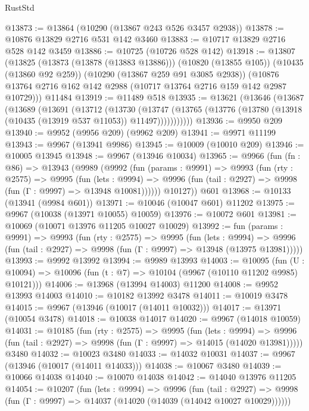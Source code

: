 \begin{lexlean}{RustStd}
\begin{coremodule}
{\begin{coremodule}
{{{{{{{{{{{{{{{{{{{{{{{{{{{{{{{{{{{{{{{{{{{{{{{{{{{{{{{{{{{{{{{{{{{{{{{{{{{{{{@13873 := @13864 (@10290 (@13867 @243 @526 @3457 @2938))
@13878 := @10876 @13829 @2716 @531 @142 @3460
@13883 := @10717 @13829 @2716 @528 @142 @3459
@13886 := @10725 (@10726 @528 @142)
@13918 := @13807
    (@13825
      (@13873 (@13878 (@13883 @13886)))
      (@10820 (@13855 @105))
      (@10435 (@13860 @92 @259))
      (@10290 (@13867 @259 @91 @3085 @2938))
      (@10876 @13764 @2716 @162 @142 @2988 (@10717 @13764 @2716 @159 @142 @2987 @10729)))
    @11484
@13919 := @11489 @518
@13935 := @13621
    (@13646
      (@13687
        (@13689
          (@13691
            (@13712
              (@13730
                (@13747
                  (@13765 (@13776 (@13780 (@13918 (@10435 (@13919 @537 @11053)) @11497)))))))))))
@13936 := @9950 @209
@13940 := @9952 (@9956 @209) (@9962 @209)
@13941 := @9971 @11199
@13943 := @9967 (@13941 @9986)
@13945 := @10009 (@10010 @209)
@13946 := @10005 @13945
@13948 := @9967 (@13946 @10034)
@13965 := @9966
    (fun (fn : @86) =>
    @13943
      (@9989
        (@9992
          (fun (params : @9991) =>
          @9993
            (fun (rty : @2575) =>
            @9995
              (fun (lets : @9994) =>
              @9996 (fun (tail : @2927) => @9998 (fun (Γ : @9997) => @13948 @10081))))))
        @10127))
    @601
@13968 := @10133 (@13941 (@9984 @601))
@13971 := @10046 (@10047 @601) @11202
@13975 := @9967 (@10038 (@13971 @10055) @10059)
@13976 := @10072 @601
@13981 := @10069 (@10071 @13976 @11205 @10027 @10029)
@13992 := fun (params : @9991) =>
  @9993
    (fun (rty : @2575) =>
    @9995
      (fun (lets : @9994) =>
      @9996 (fun (tail : @2927) => @9998 (fun (Γ : @9997) => @13948 (@13975 @13981)))))
@13993 := @9992 @13992
@13994 := @9989 @13993
@14003 := @10095
    (fun (U : @10094) => @10096 (fun (t : @7) => @10104 (@9967 (@10110 @11202 @9985) @10121)))
@14006 := @13968 (@13994 @14003) @11200
@14008 := @9952 @13993 @14003
@14010 := @10182 @13992 @3478
@14011 := @10019 @3478
@14015 := @9967 (@13946 (@10017 (@14011 @10032)))
@14017 := @13971 (@10054 @3478)
@14018 := @10038 @14017
@14020 := @9967 (@14018 @10059)
@14031 := @10185
    (fun (rty : @2575) =>
    @9995
      (fun (lets : @9994) =>
      @9996 (fun (tail : @2927) => @9998 (fun (Γ : @9997) => @14015 (@14020 @13981)))))
    @3480
@14032 := @10023 @3480
@14033 := @14032 @10031
@14037 := @9967 (@13946 (@10017 (@14011 @14033)))
@14038 := @10067 @3480
@14039 := @10066 @14038
@14040 := @10070 @14038
@14042 := @14040 @13976 @11205
@14054 := @10207
    (fun (lets : @9994) =>
    @9996
      (fun (tail : @2927) =>
      @9998 (fun (Γ : @9997) => @14037 (@14020 (@14039 (@14042 @10027 @10029))))))
}}}}}}}}}}}}}}}}}}}}}}}}}}}}}}}}}}}}}}}}}}}}}}}}}}}}}}}}}}}}}}}}}}}}}}}}}}}}}}
\end{coremodule}}
\end{coremodule}
\end{lexlean}
